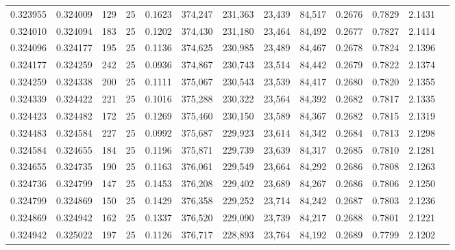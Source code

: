 \begin{tabular}{rrrrrrrrrrrrr}
0.323955 & 0.324009 &   129 &  25 &                                     0.1623 & 374,247 & 231,363 &  23,439 &  84,517 & 0.2676 & 0.7829 & 2.1431 \\
0.324010 & 0.324094 &   183 &  25 &                                     0.1202 & 374,430 & 231,180 &  23,464 &  84,492 & 0.2677 & 0.7827 & 2.1414 \\
0.324096 & 0.324177 &   195 &  25 &                                     0.1136 & 374,625 & 230,985 &  23,489 &  84,467 & 0.2678 & 0.7824 & 2.1396 \\
0.324177 & 0.324259 &   242 &  25 &                                     0.0936 & 374,867 & 230,743 &  23,514 &  84,442 & 0.2679 & 0.7822 & 2.1374 \\
0.324259 & 0.324338 &   200 &  25 &                                     0.1111 & 375,067 & 230,543 &  23,539 &  84,417 & 0.2680 & 0.7820 & 2.1355 \\
0.324339 & 0.324422 &   221 &  25 &                                     0.1016 & 375,288 & 230,322 &  23,564 &  84,392 & 0.2682 & 0.7817 & 2.1335 \\
0.324423 & 0.324482 &   172 &  25 &                                     0.1269 & 375,460 & 230,150 &  23,589 &  84,367 & 0.2682 & 0.7815 & 2.1319 \\
0.324483 & 0.324584 &   227 &  25 &                                     0.0992 & 375,687 & 229,923 &  23,614 &  84,342 & 0.2684 & 0.7813 & 2.1298 \\
0.324584 & 0.324655 &   184 &  25 &                                     0.1196 & 375,871 & 229,739 &  23,639 &  84,317 & 0.2685 & 0.7810 & 2.1281 \\
0.324655 & 0.324735 &   190 &  25 &                                     0.1163 & 376,061 & 229,549 &  23,664 &  84,292 & 0.2686 & 0.7808 & 2.1263 \\
0.324736 & 0.324799 &   147 &  25 &                                     0.1453 & 376,208 & 229,402 &  23,689 &  84,267 & 0.2686 & 0.7806 & 2.1250 \\
0.324799 & 0.324869 &   150 &  25 &                                     0.1429 & 376,358 & 229,252 &  23,714 &  84,242 & 0.2687 & 0.7803 & 2.1236 \\
0.324869 & 0.324942 &   162 &  25 &                                     0.1337 & 376,520 & 229,090 &  23,739 &  84,217 & 0.2688 & 0.7801 & 2.1221 \\
0.324942 & 0.325022 &   197 &  25 &                                     0.1126 & 376,717 & 228,893 &  23,764 &  84,192 & 0.2689 & 0.7799 & 2.1202 \\

\end{tabular}
